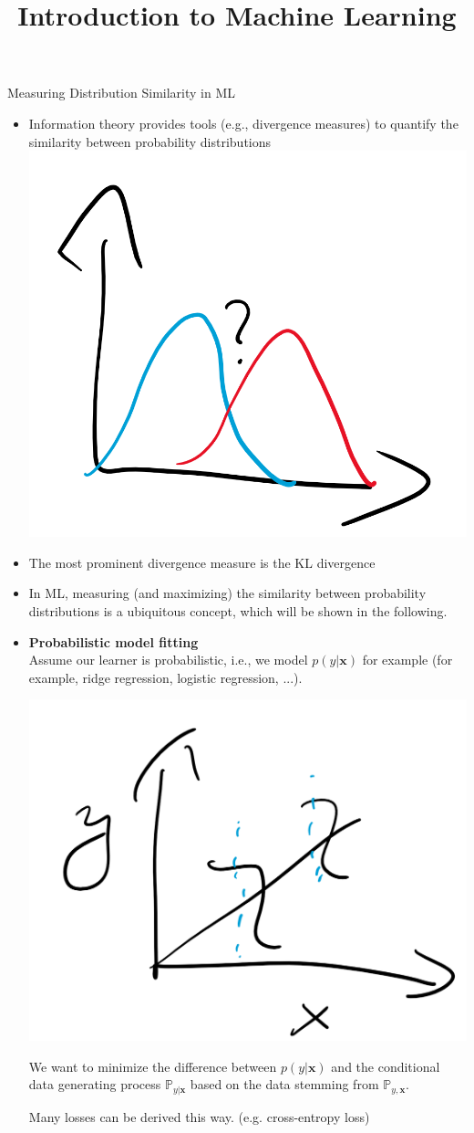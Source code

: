 \documentclass[11pt,compress,t,notes=noshow, xcolor=table]{beamer}
\title{Introduction to Machine Learning}
\date{}
\begin{document}

\begin{vbframe} {Measuring Distribution Similarity in ML}
\begin{itemize}
    \item Information theory provides tools (e.g., divergence measures) to quantify the similarity between probability distributions
\includegraphics[width=0.4\linewidth]{figure_man/kl_ml_dist_sim.png}
    \item The most prominent divergence measure is the KL divergence 
\item In ML, measuring (and maximizing) the similarity between probability distributions is a ubiquitous concept, which will be shown in the following.
\end{itemize}
\framebreak
\begin{itemize}
    \item \textbf{Probabilistic model fitting}\\
Assume our learner is probabilistic, i.e., we model $p(y| \mathbf{x})$ for example (for example, ridge regression, logistic regression, ...).

\includegraphics[width=0.4\linewidth]{slides/information-theory/figure_man/kl_ml_prob_fit.png}

We want to minimize the difference between $p(y \vert \mathbf{x})$ and the conditional data generating process $\mathbb{P}_{y\vert\mathbf{x}}$ based on the data stemming from $\mathbb{P}_{y, \mathbf{x}}.$

\lz

Many losses can be derived this way. (e.g. cross-entropy loss)


\end{itemize}
\end{vbframe}
\end{document}
